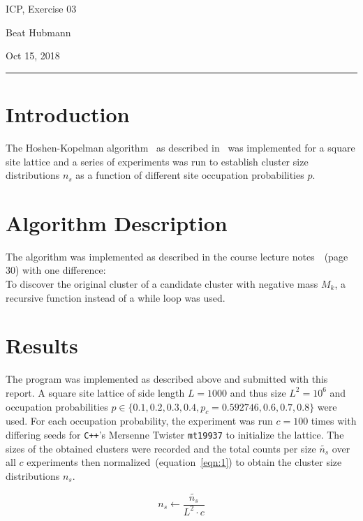 \documentclass[11pt,a4paper]{article}
\begin{document}
\noindent\parbox{\linewidth}{
 \parbox{.25\linewidth}{ \large ICP, Exercise 03 }\hfill
 \parbox{.5\linewidth}{\begin{center} \large Beat Hubmann \end{center}}\hfill
 \parbox{.2\linewidth}{\begin{flushright} \large Oct 15, 2018 \end{flushright}}
}
\noindent\rule{\linewidth}{2pt}


\section{Introduction}

The Hoshen-Kopelman algorithm~\cite{hoshen} as described in~\cite{herrmann} was implemented for a square site lattice and a series of experiments was run
to establish cluster size distributions $n_s$ as a function of different site occupation probabilities $p$.

\section{Algorithm Description}
The algorithm was implemented as described in the course lecture notes~\cite{herrmann}~(page 30) with one difference:\\
To discover the original cluster of a candidate cluster with negative mass $M_k$, a recursive function instead of a while loop was used.

\section{Results}


The program was implemented as described above and submitted with this report. 
A square site lattice of side length $L=1000$ and thus size $L^2 = 10^6$ and occupation probabilities $p \in \{0.1, 0.2, 0.3, 0.4, p_c=0.592746, 0.6, 0.7, 0.8\}$ were used.
For each occupation probability, the experiment was run $c=100$ times with differing seeds for \texttt{C++}'s Mersenne Twister \texttt{mt19937} to initialize the lattice.
The sizes of the obtained clusters were recorded and the total counts per size $\widetilde{n_s}$ over all $c$ experiments then normalized~(equation~\ref{eqn:1}) to obtain the cluster size distributions $n_s$.


\begin{equation}
n_s \leftarrow \frac{\widetilde{n_s}}{L^2 \cdot c}
\label{eqn:1}
\end{equation}
\end{document}
